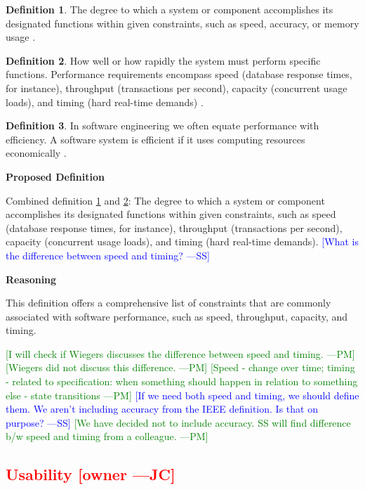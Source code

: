 \documentclass[letterpaper,cleveref]{lipics-v2019}
\newcommand{\authornote}[3]{\textcolor{#1}{[#3 ---#2]}}
\newcommand{\authornote}[3]{}
\newcommand{\wss}[1]{\authornote{blue}{SS}{#1}} %
\newcommand{\jc}[1]{\authornote{red}{JC}{#1}} %
\newcommand{\pmi}[1]{\authornote{green}{PM}{#1}} %
\newcommand{\notdone}[1]{\textcolor{red}{#1}}
\theoremstyle{definition}
\newtheorem{defn}{Definition}
\begin{document}
\begin{defn} \label{PerformanceDefnSelected}
	The degree to which a system or component accomplishes its designated functions
	within given constraints, such as speed, accuracy, or memory usage
	\citep{IEEEStdGlossarySET1990}.
\end{defn}
\begin{defn} \label{PerformanceDefnSelected2}
	How well or how rapidly the system must perform specific functions. Performance
	requirements encompass speed (database response times, for instance), throughput
	(transactions per second), capacity (concurrent usage loads), and timing (hard
	real-time demands) \citep{wiegers2003softreq}.
\end{defn}
\begin{defn}
	In software engineering we often equate performance with efficiency. A software system is efficient if it uses computing resources economically
	\citep{ghezzi1991fundamentals}.
\end{defn}

\noindent \textbf{Proposed Definition}

Combined definition \ref{PerformanceDefnSelected} and
\ref{PerformanceDefnSelected2}: The degree to which a system or component
accomplishes its designated functions within given constraints, such as speed
(database response times, for instance), throughput (transactions per second),
capacity (concurrent usage loads), and timing (hard real-time
demands). \wss{What is the difference between speed and timing?}

\noindent \textbf{Reasoning}

This definition offers a comprehensive list of constraints that are commonly
associated with software performance, such as speed, throughput, capacity, and
timing.

\pmi{I will check if Wiegers discusses the difference between speed and timing.}
\pmi{Wiegers did not discuss this difference.}
\pmi{Speed - change over time; timing - related to specification: when something
	should happen in relation to something else - state transitions}
\wss{If we need both speed and timing, we should define them.  We aren't
  including accuracy from the IEEE definition.  Is that on purpose?}
\pmi{We have decided not to include accuracy. SS will find difference b/w speed and timing from a colleague.}

\subsection{\notdone{Usability} \jc{owner}} 
\end{document}
